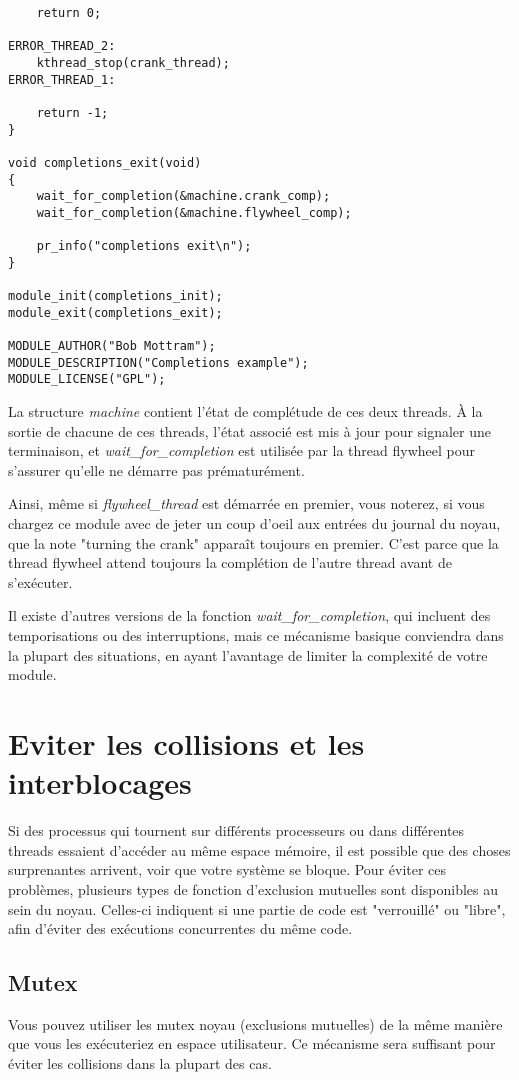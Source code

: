 \documentclass[11pt]{article}
\begin{document}
\begin{verbatim}
    return 0;

ERROR_THREAD_2:
    kthread_stop(crank_thread);
ERROR_THREAD_1:

    return -1;
}

void completions_exit(void)
{
    wait_for_completion(&machine.crank_comp);
    wait_for_completion(&machine.flywheel_comp);

    pr_info("completions exit\n");
}

module_init(completions_init);
module_exit(completions_exit);

MODULE_AUTHOR("Bob Mottram");
MODULE_DESCRIPTION("Completions example");
MODULE_LICENSE("GPL");
\end{verbatim}

La structure \emph{machine} contient l'état de complétude de ces deux threads. À la sortie de chacune de ces threads, l'état associé est mis à jour pour signaler une terminaison, et \emph{wait\_for\_completion} est utilisée par la thread flywheel pour s'assurer qu'elle ne démarre pas prématurément.

Ainsi, même si \emph{flywheel\_thread} est démarrée en premier, vous noterez, si vous chargez ce module avec de jeter un coup d'oeil aux entrées du journal du noyau, que la note "turning the crank" apparaît toujours en premier. C'est parce que la thread flywheel attend toujours la complétion de l'autre thread avant de s'exécuter.

Il existe d'autres versions de la fonction \emph{wait\_for\_completion}, qui incluent des temporisations ou des interruptions, mais ce mécanisme basique conviendra dans la plupart des situations, en ayant l'avantage de limiter la complexité de votre module.

\section*{Eviter les collisions et les interblocages}
\label{sec-12}
Si des processus qui tournent sur différents processeurs ou dans différentes threads essaient d'accéder au même espace mémoire, il est possible que des choses surprenantes arrivent, voir que votre système se bloque. Pour éviter ces problèmes, plusieurs types de fonction d'exclusion mutuelles sont disponibles au sein du noyau. Celles-ci indiquent si une partie de code est "verrouillé" ou "libre", afin d'éviter des exécutions concurrentes du même code.

\subsection*{Mutex}
\label{sec-12-1}
Vous pouvez utiliser les mutex noyau (exclusions mutuelles) de la même manière que vous les exécuteriez en espace utilisateur. Ce mécanisme sera suffisant pour éviter les collisions dans la plupart des cas.
\end{document}
